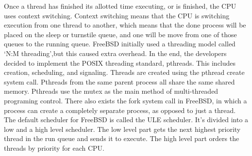 \documentclass[titlepage]{article}
\begin{document}
\begin{singlespace}
Once a thread has finished its allotted time executing, or is finished, the CPU uses context switching. Context switching means that the CPU is switching execution from one thread to another, which means that the done process will be placed on the sleep or turnstile queue, and one will be move from one of those queues to the running queue.
    FreeBSD initially used a threading model called ‘N:M threading’,but this caused extra overhead. In the end, the developers decided to implement the POSIX threading standard, pthreads. This includes creation, scheduling, and signaling. Threads are created using the pthread create system call. Pthreads from the same parent process all share the same shared memory. Pthreads use the mutex as the main method of multi-threaded programing control. There also exists the fork system call in FreeBSD, in which a process can create a completely separate process, as opposed to just a thread. 
    The default scheduler for FreeBSD is called the ULE scheduler. It’s divided into a low and a high level scheduler. The low level part gets the next highest priority thread in the run queue and sends it to execute. The high level part orders the threads by priority for each CPU. \cite{freebsdch4}


\end{singlespace}
\end{document}
